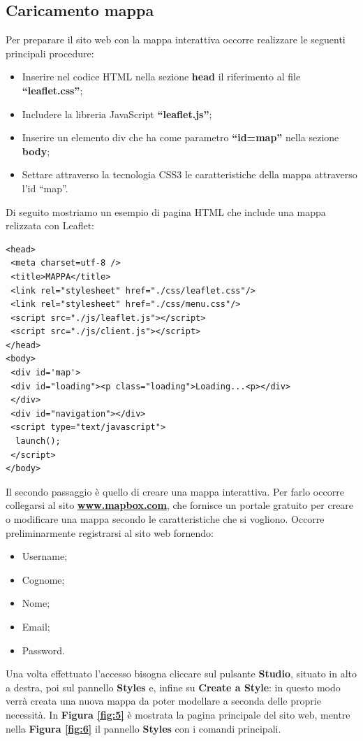 \documentclass[a4paper,11pt]{article}
\begin{document}
\subsection{Caricamento mappa}
\label{sec:3.1}
Per preparare il sito web con la mappa interattiva occorre realizzare le seguenti principali procedure:
\begin{itemize}
	\item Inserire nel codice HTML nella sezione \textbf{head} il riferimento al file \textbf{"`leaflet.css"'};
	\item Includere la libreria JavaScript \textbf{"`leaflet.js"'};
	\item Inserire un elemento div che ha come parametro \textbf{"`id=map"'} nella sezione \textbf{body};
	\item Settare attraverso la tecnologia CSS3 le caratteristiche della mappa attraverso l'id "`map"'.				
\end{itemize}
Di seguito mostriamo un esempio di pagina HTML che include una mappa relizzata con Leaflet:
\begin{lstlisting}[style=htmlcssjs]
<head>
 <meta charset=utf-8 />
 <title>MAPPA</title>
 <link rel="stylesheet" href="./css/leaflet.css"/>
 <link rel="stylesheet" href="./css/menu.css"/>		
 <script src="./js/leaflet.js"></script>
 <script src="./js/client.js"></script>		
</head>
<body>		
 <div id='map'>
 <div id="loading"><p class="loading">Loading...<p></div>
 </div>					
 <div id="navigation"></div>		
 <script type="text/javascript">
  launch();
 </script>
</body>
\end{lstlisting}
Il secondo passaggio è quello di creare una mappa interattiva. Per farlo occorre collegarsi al sito \textbf{\url{www.mapbox.com}}, che fornisce un portale gratuito per creare o modificare una mappa secondo le caratteristiche che si vogliono.
Occorre preliminarmente registrarsi al sito web fornendo:
\begin{itemize}
	\item Username;
	\item Cognome;
	\item Nome;
	\item Email;
	\item Password.
\end{itemize}
Una volta effettuato l'accesso bisogna cliccare sul pulsante \textbf{Studio}, situato in alto a destra, poi sul pannello \textbf{Styles} e, infine su \textbf{Create a Style}: in questo modo verrà creata una nuova mappa da poter modellare a seconda delle proprie necessità. In \textbf{Figura \ref{fig:5}} è mostrata la pagina principale del sito web, mentre nella \textbf{Figura \ref{fig:6}} il pannello \textbf{Styles} con i comandi principali.
\end{document}
